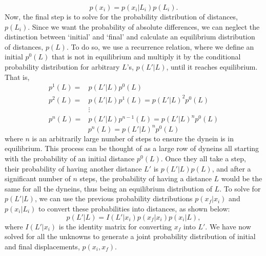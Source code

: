 \begin{equation}
	p(x_i)=p(x_i|L_i)p(L_i).
\end{equation}
Now, the final step is to solve for the probability distribution of distances, $p(L_i)$. Since we want the probability of absolute differences, we can neglect the distinction between `initial' and `final' and calculate an equilibrium distribution of distances, $p(L)$. To do so, we use a recurrence relation, where we define an initial $p^0(L)$ that is not in equilibrium and multiply it by the conditional probability distribution for arbitrary $L$'s, $p(L'|L)$, until it reaches equilibrium. That is,
\begin{align*}
	p^1(L)= & p(L'|L)p^0(L) \\
	p^2(L)= & p(L'|L)p^1(L)=p(L'|L)^2p^0(L)\\
	&\vdots \\
	p^n(L)= & p(L'|L)p^{n-1}(L)=p(L'|L)^np^0(L) 
\end{align*}
\begin{equation}
	p^n(L)=p(L'|L)^np^0(L) 	
\end{equation}
where $n$ is an arbitrarily large number of steps to ensure the dynein is in equilibrium. This process can be thought of as a large row of dyneins all starting with the probability of an initial distance $p^0(L)$. Once they all take a step, their probability of having another distance $L'$ is $p(L'|L)p(L)$, and after a significant number of $n$ steps, the probability of having a distance $L$ would be the same for all the dyneins, thus being an equilibrium distribution of $L$. To solve for $p(L'|L)$, we can use the previous probability distributions $p(x_f|x_i)$ and $p(x_i|L_i)$ to convert these probabilities into distances, as shown below:
\begin{equation}
	p(L'|L)=I(L'|x_i)p(x_f|x_i)p(x_i|L),
\end{equation}
where $I(L'|x_i)$ is the identity matrix for converting $x_f$ into $L'$. We have now solved for all the unknowns to generate a joint probability distribution of initial and final displacements, $p(x_i,x_f)$. 


